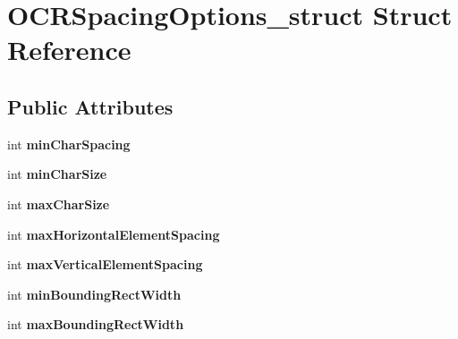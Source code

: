 \hypertarget{structOCRSpacingOptions__struct}{\section{\-O\-C\-R\-Spacing\-Options\-\_\-struct \-Struct \-Reference}
\label{structOCRSpacingOptions__struct}
}
\subsection*{\-Public \-Attributes}
\begin{DoxyCompactItemize}
\item 
\hypertarget{structOCRSpacingOptions__struct_acf21cffd3fdee7d2881e602622617395}{int {\bfseries min\-Char\-Spacing}}\label{structOCRSpacingOptions__struct_acf21cffd3fdee7d2881e602622617395}

\item 
\hypertarget{structOCRSpacingOptions__struct_aedbdc17d26d35768ed2a1bb02255c578}{int {\bfseries min\-Char\-Size}}\label{structOCRSpacingOptions__struct_aedbdc17d26d35768ed2a1bb02255c578}

\item 
\hypertarget{structOCRSpacingOptions__struct_a7e24ec27ffca7b8215eca0c9678a73b1}{int {\bfseries max\-Char\-Size}}\label{structOCRSpacingOptions__struct_a7e24ec27ffca7b8215eca0c9678a73b1}

\item 
\hypertarget{structOCRSpacingOptions__struct_a13469fd9e045a628e7dcf46ec9c37df1}{int {\bfseries max\-Horizontal\-Element\-Spacing}}\label{structOCRSpacingOptions__struct_a13469fd9e045a628e7dcf46ec9c37df1}

\item 
\hypertarget{structOCRSpacingOptions__struct_abab2f42296aa18603b453c36114053be}{int {\bfseries max\-Vertical\-Element\-Spacing}}\label{structOCRSpacingOptions__struct_abab2f42296aa18603b453c36114053be}

\item 
\hypertarget{structOCRSpacingOptions__struct_a6c29b20e6c8c291a08a07db23a78cd8b}{int {\bfseries min\-Bounding\-Rect\-Width}}\label{structOCRSpacingOptions__struct_a6c29b20e6c8c291a08a07db23a78cd8b}

\item 
\hypertarget{structOCRSpacingOptions__struct_a0b99ac3f19a4f22eb3edeaa29adfefcf}{int {\bfseries max\-Bounding\-Rect\-Width}}\label{structOCRSpacingOptions__struct_a0b99ac3f19a4f22eb3edeaa29adfefcf}


\end{DoxyCompactItemize}
